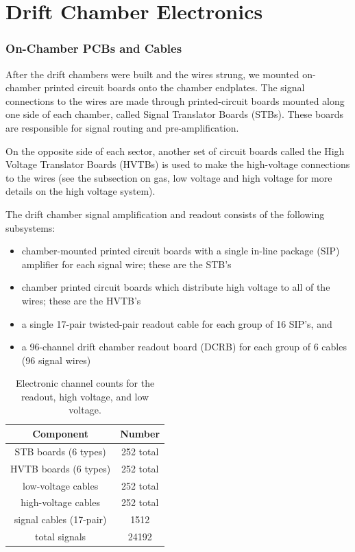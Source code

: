 \section{Drift Chamber Electronics}
\subsubsection{On-Chamber PCBs and Cables}
After the drift chambers were built and the wires strung, we mounted
on-chamber printed circuit boards onto the chamber endplates.
The signal connections to the wires are made through printed-circuit 
boards mounted along one side of each chamber, called Signal Translator 
Boards (STBs).  These boards are responsible for signal routing and 
pre-amplification.  

On the opposite side of each sector, another set of 
circuit boards called the High Voltage Translator Boards (HVTBs) is used 
to make the high-voltage connections to the wires (see the subsection
on gas, low voltage and high voltage for more details on the high
voltage system).

The drift chamber signal amplification and readout consists of the 
following subsystems:
\begin{itemize}
\item  chamber-mounted printed circuit boards with a single in-line package
(SIP) amplifier for each signal wire; these are the STB's
\item  chamber printed circuit boards which distribute high voltage
to all of the wires; these are the HVTB's
\item a single 17-pair twisted-pair readout cable for each group of 16
SIP's, and
\item a 96-channel drift chamber readout board (DCRB) for each group
of 6 cables (96 signal wires)
\end{itemize}


\begin{table}[htbp]
\begin{center}
\begin{tabular} {||c|c||} \hline \hline
{\bf Component}           & {\bf Number} \\ \hline
STB boards (6 types)      & 252 total \\ \hline
HVTB boards (6 types)     & 252 total \\ \hline
low-voltage cables        & 252 total  \\ \hline
high-voltage cables       & 252 total  \\ \hline
signal cables (17-pair)   & 1512 \\ \hline
total signals             & 24192 \\ \hline \hline
\end{tabular}
\caption{\small{Electronic channel counts for the readout, high voltage,
and low voltage.}}
\label{electronic-channels}
\end{center}
\end{table}



